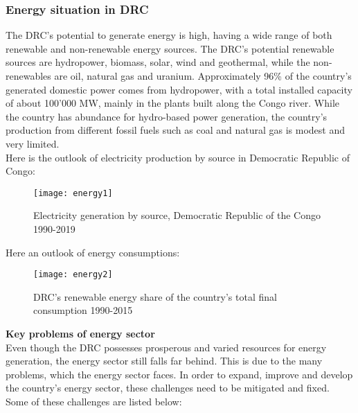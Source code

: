 \documentclass{article}
\begin{document}
\subsubsection{Energy situation in DRC}
The DRC's potential to generate energy is high, having a wide range of both renewable and non-renewable energy sources. The DRC's potential renewable sources are hydropower, biomass, solar, wind and geothermal, while the non-renewables are oil, natural gas and uranium. Approximately 96\% of the country's generated domestic power comes from hydropower, with a total installed capacity of about 100'000 MW, mainly in the plants built along the Congo river. While the country has abundance for hydro-based power generation, the country's production from different fossil fuels such as coal and natural gas is modest and very limited.\\
Here is the outlook of electricity production by source in Democratic Republic of Congo:
\begin{figure}[H]
{\centering
\texttt{[image: energy1]}
\caption{Electricity generation by source, Democratic Republic of the Congo 1990-2019 \cite{iea}}}
\end{figure} 
Here an outlook of energy consumptions:
\begin{figure}[H]
{\centering
\texttt{[image: energy2]}
\caption{DRC's renewable energy share of the country's total final consumption 1990-2015 \cite{sdg}}}
\end{figure}
\newpage
\textbf{Key problems of energy sector}\\
Even though the DRC possesses prosperous and varied resources for energy generation, the energy sector still falls far behind. This is due to the many problems, which the energy sector faces. In order to expand, improve and develop the country's energy sector, these challenges need to be mitigated and fixed. Some of these challenges are listed below:   
\end{document}
